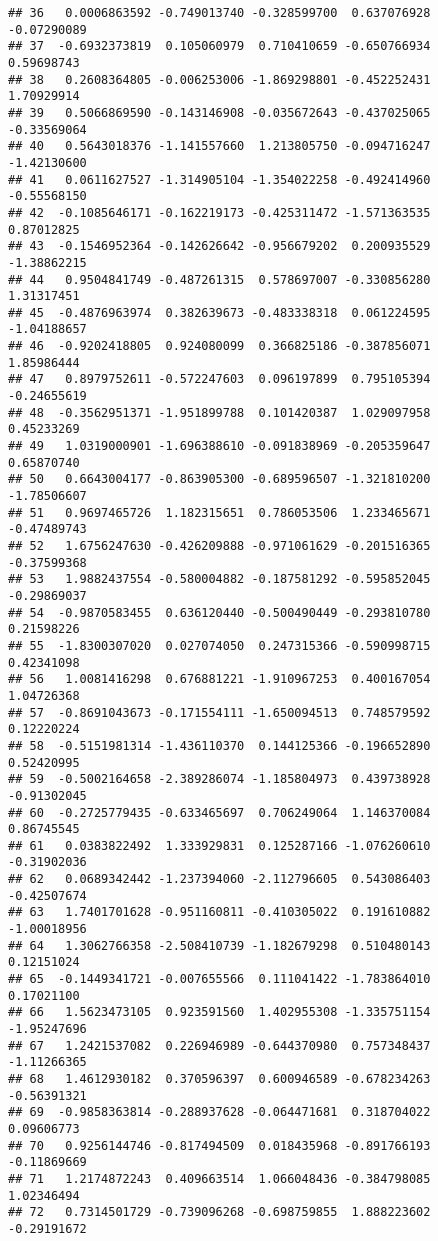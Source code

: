 \documentclass[
]{article}
\begin{document}
\begin{verbatim}
## 36   0.0006863592 -0.749013740 -0.328599700  0.637076928 -0.07290089
## 37  -0.6932373819  0.105060979  0.710410659 -0.650766934  0.59698743
## 38   0.2608364805 -0.006253006 -1.869298801 -0.452252431  1.70929914
## 39   0.5066869590 -0.143146908 -0.035672643 -0.437025065 -0.33569064
## 40   0.5643018376 -1.141557660  1.213805750 -0.094716247 -1.42130600
## 41   0.0611627527 -1.314905104 -1.354022258 -0.492414960 -0.55568150
## 42  -0.1085646171 -0.162219173 -0.425311472 -1.571363535  0.87012825
## 43  -0.1546952364 -0.142626642 -0.956679202  0.200935529 -1.38862215
## 44   0.9504841749 -0.487261315  0.578697007 -0.330856280  1.31317451
## 45  -0.4876963974  0.382639673 -0.483338318  0.061224595 -1.04188657
## 46  -0.9202418805  0.924080099  0.366825186 -0.387856071  1.85986444
## 47   0.8979752611 -0.572247603  0.096197899  0.795105394 -0.24655619
## 48  -0.3562951371 -1.951899788  0.101420387  1.029097958  0.45233269
## 49   1.0319000901 -1.696388610 -0.091838969 -0.205359647  0.65870740
## 50   0.6643004177 -0.863905300 -0.689596507 -1.321810200 -1.78506607
## 51   0.9697465726  1.182315651  0.786053506  1.233465671 -0.47489743
## 52   1.6756247630 -0.426209888 -0.971061629 -0.201516365 -0.37599368
## 53   1.9882437554 -0.580004882 -0.187581292 -0.595852045 -0.29869037
## 54  -0.9870583455  0.636120440 -0.500490449 -0.293810780  0.21598226
## 55  -1.8300307020  0.027074050  0.247315366 -0.590998715  0.42341098
## 56   1.0081416298  0.676881221 -1.910967253  0.400167054  1.04726368
## 57  -0.8691043673 -0.171554111 -1.650094513  0.748579592  0.12220224
## 58  -0.5151981314 -1.436110370  0.144125366 -0.196652890  0.52420995
## 59  -0.5002164658 -2.389286074 -1.185804973  0.439738928 -0.91302045
## 60  -0.2725779435 -0.633465697  0.706249064  1.146370084  0.86745545
## 61   0.0383822492  1.333929831  0.125287166 -1.076260610 -0.31902036
## 62   0.0689342442 -1.237394060 -2.112796605  0.543086403 -0.42507674
## 63   1.7401701628 -0.951160811 -0.410305022  0.191610882 -1.00018956
## 64   1.3062766358 -2.508410739 -1.182679298  0.510480143  0.12151024
## 65  -0.1449341721 -0.007655566  0.111041422 -1.783864010  0.17021100
## 66   1.5623473105  0.923591560  1.402955308 -1.335751154 -1.95247696
## 67   1.2421537082  0.226946989 -0.644370980  0.757348437 -1.11266365
## 68   1.4612930182  0.370596397  0.600946589 -0.678234263 -0.56391321
## 69  -0.9858363814 -0.288937628 -0.064471681  0.318704022  0.09606773
## 70   0.9256144746 -0.817494509  0.018435968 -0.891766193 -0.11869669
## 71   1.2174872243  0.409663514  1.066048436 -0.384798085  1.02346494
## 72   0.7314501729 -0.739096268 -0.698759855  1.888223602 -0.29191672

\end{verbatim}
\end{document}
